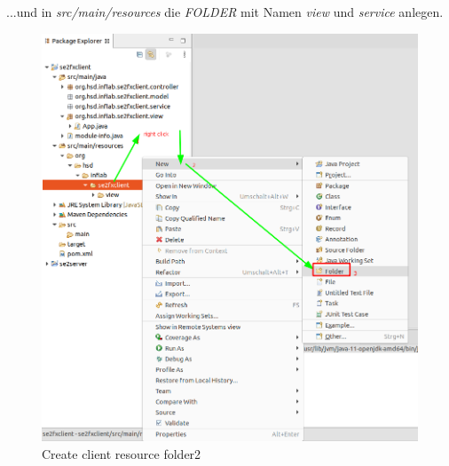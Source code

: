 \documentclass[11pt]{scrartcl}
\begin{document}
\newpage
...und in \textit{src/main/resources} die \textit{FOLDER} mit 
Namen \textit{view} und \textit{service} anlegen.

\begin{figure}[!ht]
    \includegraphics[width=\linewidth]{images/eclipse22_client_resource_folder2.png}
    \caption{Create client resource folder2}
    \label{fig:createclientresourcefolder2}
\end{figure}
\end{document}
